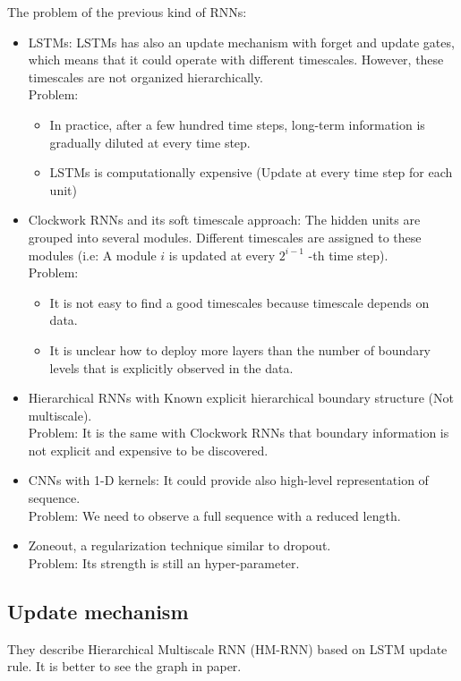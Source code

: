 \documentclass{article}
\begin{document}
The problem of the previous kind of RNNs:
\begin{itemize}
\item LSTMs: LSTMs has also an update mechanism with forget and update gates, which means that it could operate with different timescales. However, these timescales are not organized hierarchically. \\
Problem:
	\begin{itemize}
	 \item In practice, after a few hundred time steps, long-term information is gradually diluted at every time step.
	 \item LSTMs is computationally expensive (Update at every time step for each unit)
 	\end{itemize} 
 	
\item Clockwork RNNs and its soft timescale approach: The hidden units are grouped into several modules. Different timescales are assigned to these modules (i.e: A module $i$ is updated at every $2^{i - 1}$ -th time step).\\
Problem:
	\begin{itemize}
	\item It is not easy to find a good timescales because timescale depends on data.
	\item It is unclear how to deploy more layers than the number of boundary levels that is explicitly observed in the data.
	\end{itemize}
	
\item Hierarchical RNNs with Known explicit hierarchical boundary structure (Not multiscale).\\ Problem: It is the same with Clockwork RNNs that boundary information is not explicit and expensive to be discovered.

\item CNNs with 1-D kernels: It could provide also high-level representation of sequence.\\
Problem: We need to observe a full sequence with a reduced length.

\item Zoneout, a regularization technique similar to dropout.\\
Problem: Its strength is still an hyper-parameter.

\end{itemize}

\subsection{Update mechanism}
They describe Hierarchical Multiscale RNN (HM-RNN) based on LSTM update rule. It is better to see the graph in paper.\\
\end{document}
